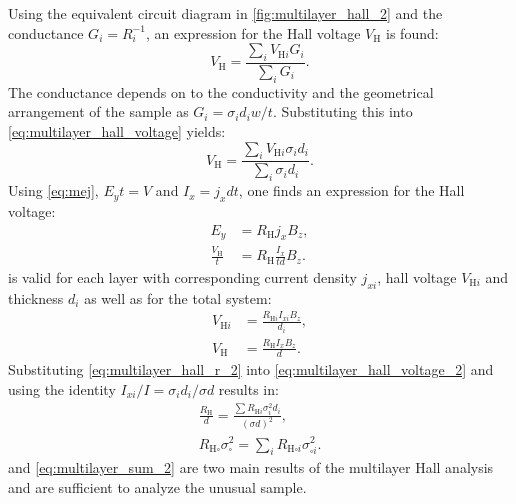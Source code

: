 Using the equivalent circuit diagram in \cref{fig:multilayer_hall_2} and the conductance
$G_i = R_i^{-1}$, an expression for the Hall voltage $V_{\mathrm{H}}$ is found:
\begin{equation}
	V_{\mathrm{H}}=\frac{\sum_{i}V_{\mathrm{H}i}G_{i}}{\sum_{i}G_{i}}.
	\label{eq:multilayer_hall_voltage}
\end{equation}
The conductance depends on to the conductivity and the geometrical arrangement of the 
sample as $G_i = \sigma_i d_i w/ t$. Substituting this into 
\cref{eq:multilayer_hall_voltage} yields:
\begin{equation}
	V_{\mathrm{H}}=\frac{\sum_{i}V_{\mathrm{H}i}  
	\sigma_{i}d_{i}}{\sum_{i} \sigma_{i}d_{i}}.
	\label{eq:multilayer_hall_voltage_2}
\end{equation}
Using \cref{eq:mej}, $E_y t = V$ and $I_x=j_x d t$, one finds an expression 
for the Hall voltage:
\begin{align}
	E_{y}&=R_{\mathrm{H}}j_{x}B_{z},\\
	\frac{V_{\mathrm{H}}}{t}&=R_{\mathrm{H}}\frac{I_{x}}{t d}B_{z}.
	\label{eq:multilayer_hall_r}
\end{align}
 is valid for each layer with corresponding current density
$j_{xi}$, hall voltage $V_{\mathrm{H}i}$ and thickness $d_i$ as well as for the total 
system:
\begin{align}
	V_{\mathrm{H}i} &= \frac{R_{\mathrm{H}i}I_{xi} B_z}{d_{i}}, \\
	V_{\mathrm{H}}&=\frac{R_{\mathrm{H}}I_{x}B_z}{d}.
	\label{eq:multilayer_hall_r_2}
\end{align}
Substituting \cref{eq:multilayer_hall_r_2} into \cref{eq:multilayer_hall_voltage_2} and
using the identity $I_{xi} /I=\sigma_{i}d_{i} /\sigma d$ results in:
\begin{align}
	\frac{R_{\mathrm{H}}}{d}=\frac{\sum R_{\mathrm{H}i} \sigma_{i}^{2} d_{i}}
	{(\sigma d)^2}, \\
	R_{\mathrm{H \square}}\sigma_{\square}^2=\sum_{i}R_{\mathrm{H}\square i} 
	\sigma_{\square i}^{2}.
	\label{eq:multilayer_sum_2}
\end{align}
 and \cref{eq:multilayer_sum_2} are two main results of the 
multilayer Hall analysis and are sufficient to analyze the unusual  sample.